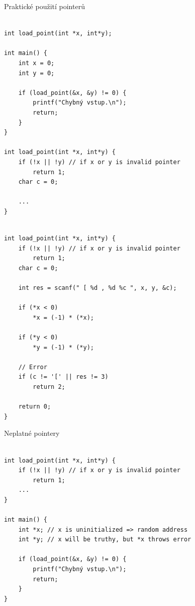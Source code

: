\documentclass{beamer}
\begin{document}
\begin{frame}[fragile]{Praktické použití pointerů}

{\small
\begin{verbatim}

int load_point(int *x, int*y);

int main() {
    int x = 0;
    int y = 0;

    if (load_point(&x, &y) != 0) {
        printf("Chybný vstup.\n");
        return;
    }
}

int load_point(int *x, int*y) {
    if (!x || !y) // if x or y is invalid pointer
        return 1;
    char c = 0;

    ...
}

\end{verbatim}
}

\end{frame}

\begin{frame}[fragile]

{\small
\begin{verbatim}

int load_point(int *x, int*y) {
    if (!x || !y) // if x or y is invalid pointer
        return 1;
    char c = 0;

    int res = scanf(" [ %d , %d %c ", x, y, &c);

    if (*x < 0)
        *x = (-1) * (*x);
        
    if (*y < 0)
        *y = (-1) * (*y);

    // Error
    if (c != '[' || res != 3)
        return 2;

    return 0;
}
\end{verbatim}
}


\end{frame}

\begin{frame}[fragile]{Neplatné pointery}

\begin{verbatim}

int load_point(int *x, int*y) {
    if (!x || !y) // if x or y is invalid pointer
        return 1;
    ...
}

int main() {
    int *x; // x is uninitialized => random address
    int *y; // x will be truthy, but *x throws error

    if (load_point(&x, &y) != 0) {
        printf("Chybný vstup.\n");
        return;
    }
}

\end{verbatim}

\end{frame}
\end{document}
